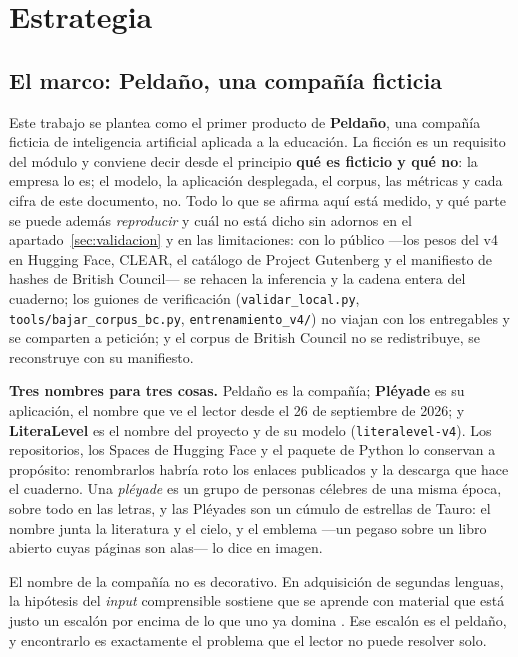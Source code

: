 \documentclass[11pt,a4paper]{article}
\newcommand{\cod}[1]{\texttt{\small #1}}
\begin{document}
\section{Estrategia}
\label{sec:estrategia}

\subsection{El marco: Peldaño, una compañía ficticia}
\label{sec:compania}

Este trabajo se plantea como el primer producto de \textbf{Peldaño}, una compañía
ficticia de inteligencia artificial aplicada a la educación. La ficción es un requisito
del módulo y conviene decir desde el principio \textbf{qué es ficticio y qué no}: la
empresa lo es; el modelo, la aplicación desplegada, el corpus, las métricas y cada cifra
de este documento, no. Todo lo que se afirma aquí está medido, y qué parte se puede
además \emph{reproducir} y cuál no está dicho sin adornos en el
apartado~\ref{sec:validacion} y en las limitaciones: con lo público —los pesos del v4 en
Hugging Face, CLEAR, el catálogo de Project Gutenberg y el manifiesto de hashes de British
Council— se rehacen la inferencia y la cadena entera del cuaderno; los guiones de
verificación (\cod{validar\_local.py}, \cod{tools/\allowbreak bajar\_corpus\_bc.py},
\cod{entrenamiento\_v4/}) no viajan con los entregables y se comparten a petición; y el
corpus de British Council no se redistribuye, se reconstruye con su manifiesto.

\textbf{Tres nombres para tres cosas.} Peldaño es la compañía; \textbf{Pléyade} es su
aplicación, el nombre que ve el lector desde el 26 de septiembre de 2026; y
\textbf{LiteraLevel} es el nombre del proyecto y de su modelo (\cod{literalevel-v4}). Los
repositorios, los Spaces de Hugging Face y el paquete de Python lo conservan a propósito:
renombrarlos habría roto los enlaces publicados y la descarga que hace el cuaderno. Una
\emph{pléyade} es un grupo de personas célebres de una misma época, sobre todo en las letras,
y las Pléyades son un cúmulo de estrellas de Tauro: el nombre junta la literatura y el cielo, y
el emblema ---un pegaso sobre un libro abierto cuyas páginas son alas--- lo dice en imagen.

El nombre de la compañía no es decorativo. En adquisición de segundas lenguas, la hipótesis del
\emph{input} comprensible sostiene que se aprende con material que está justo un
escalón por encima de lo que uno ya domina \parencite{krashen1985input}. Ese
escalón es el peldaño, y encontrarlo es exactamente el problema que el lector no puede
resolver solo.
\end{document}
